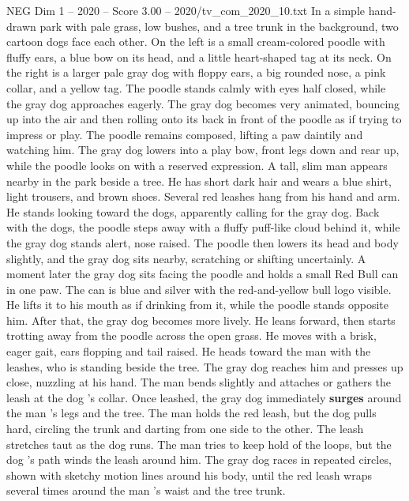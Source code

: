 \begin{textsample}{NEG Dim 1 – 2020 – Score 3.00 – 2020/tv\_com\_2020\_10.txt}  \label{ex:f1_neg_089}
In a simple hand-drawn park with pale grass, low bushes, and a tree trunk in the background, two cartoon dogs face each other.
On the left is a small cream-colored poodle with fluffy ears, a blue bow on its head, and a little heart-shaped tag at its neck.
On the right is a larger pale gray dog with floppy ears, a big rounded nose, a pink collar, and a yellow tag.
The poodle stands calmly with eyes half closed, while the gray dog approaches eagerly.
The gray dog becomes very animated, bouncing up into the air and then rolling onto its back in front of the poodle as if trying to impress or play.
The poodle remains composed, lifting a paw daintily and watching him.
The gray dog lowers into a play bow, front legs down and rear up, while the poodle looks on with a reserved expression.
A tall, slim man appears nearby in the park beside a tree.
He has short dark hair and wears a blue shirt, light trousers, and brown shoes.
Several red leashes hang from his hand and arm.
He stands looking toward the dogs, apparently calling for the gray dog.
Back with the dogs, the poodle steps away with a fluffy puff-like cloud behind it, while the gray dog stands alert, nose raised.
The poodle then lowers its head and body slightly, and the gray dog sits nearby, scratching or shifting uncertainly.
A moment later the gray dog sits facing the poodle and holds a small Red Bull can in one paw.
The can is blue and silver with the red-and-yellow bull logo visible.
He lifts it to his mouth as if drinking from it, while the poodle stands opposite him.
After that, the gray dog becomes more lively.
He leans forward, then starts trotting away from the poodle across the open grass.
He moves with a brisk, eager gait, ears flopping and tail raised.
He heads toward the man with the leashes, who is standing beside the tree.
The gray dog reaches him and presses up close, nuzzling at his hand.
The man bends slightly and attaches or gathers the leash at the dog ’s collar.
Once leashed, the gray dog immediately \textbf{surges} around the man ’s legs and the tree.
The man holds the red leash, but the dog pulls hard, circling the trunk and darting from one side to the other.
The leash stretches taut as the dog runs.
The man tries to keep hold of the loops, but the dog ’s path winds the leash around him.
The gray dog races in repeated circles, shown with sketchy motion lines around his body, until the red leash wraps several times around the man ’s waist and the tree trunk.

\end{textsample}
